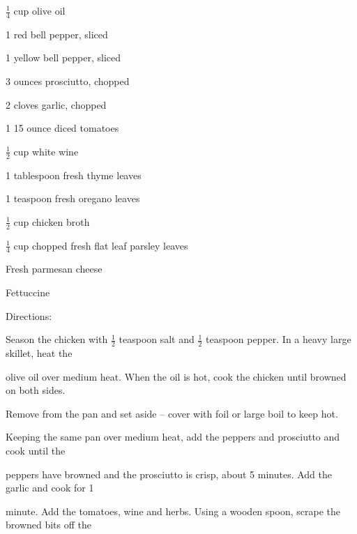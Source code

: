 \documentclass[a4paper,portrait,12pt]{book}
\begin{document}
$\frac{1}{4}$ cup olive oil




1 red bell pepper, sliced




1 yellow bell pepper, sliced




3 ounces prosciutto, chopped




2 cloves garlic, chopped




1 15 ounce diced tomatoes




$\frac{1}{2}$ cup white wine




1 tablespoon fresh thyme leaves




1 teaspoon fresh oregano leaves




$\frac{1}{2}$ cup chicken broth




$\frac{1}{4}$ cup chopped fresh flat leaf parsley leaves




Fresh parmesan cheese




Fettuccine




Directions:




Season the chicken with $\frac{1}{2}$ teaspoon salt and $\frac{1}{2}$ teaspoon pepper. In a heavy large skillet, heat the




olive oil over medium heat. When the oil is hot, cook the chicken until browned on both sides.




Remove from the pan and set aside -- cover with foil or large boil to keep hot.




Keeping the same pan over medium heat, add the peppers and prosciutto and cook until the




peppers have browned and the prosciutto is crisp, about 5 minutes. Add the garlic and cook for 1




minute. Add the tomatoes, wine and herbs. Using a wooden spoon, scrape the browned bits off the
\end{document}
